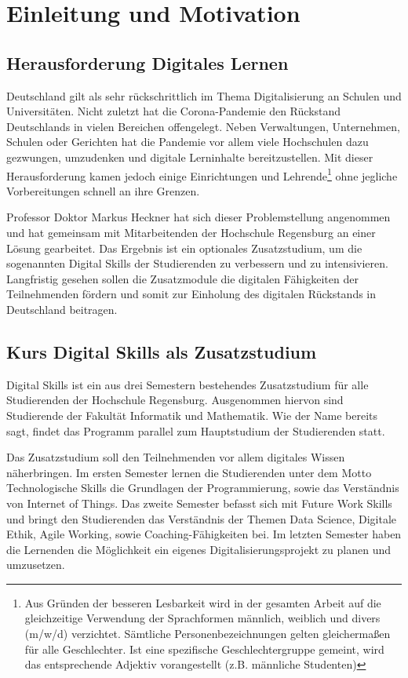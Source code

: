 \section{Einleitung und Motivation}\label{einleitung}
\subsection{Herausforderung Digitales Lernen}\label{herausforderung}
Deutschland gilt als sehr rückschrittlich im Thema Digitalisierung an Schulen
und Universitäten. Nicht zuletzt hat die Corona-Pandemie den Rückstand
Deutschlands in vielen Bereichen offengelegt. Neben Verwaltungen, Unternehmen,
Schulen oder Gerichten hat die Pandemie vor allem viele Hochschulen dazu
gezwungen, umzudenken und digitale Lerninhalte bereitzustellen. Mit dieser
Herausforderung kamen jedoch einige Einrichtungen und Lehrende\footnote{Aus
Gründen der besseren Lesbarkeit wird in der gesamten Arbeit auf die
gleichzeitige Verwendung der Sprachformen männlich, weiblich und divers (m/w/d)
verzichtet. Sämtliche Personenbezeichnungen gelten gleichermaßen für alle
Geschlechter. Ist eine spezifische Geschlechtergruppe gemeint, wird das
entsprechende Adjektiv vorangestellt (z.B. \glqq männliche Studenten\grqq)} ohne
jegliche Vorbereitungen schnell an ihre Grenzen. \parencite{bmwi-rueckstand}

Professor Doktor Markus Heckner hat sich dieser Problemstellung angenommen und
hat gemeinsam mit Mitarbeitenden der Hochschule Regensburg an einer Lösung
gearbeitet. Das Ergebnis ist ein optionales Zusatzstudium, um die sogenannten
\glqq Digital Skills\grqq{} der Studierenden zu verbessern und zu intensivieren.
Langfristig gesehen sollen die Zusatzmodule die digitalen Fähigkeiten der
Teilnehmenden fördern und somit zur Einholung des digitalen Rückstands in
Deutschland beitragen. \parencite{digital-skills}

\subsection{Kurs Digital Skills als Zusatzstudium}\label{kurs-digital-skills}
Digital Skills ist ein aus drei Semestern bestehendes Zusatzstudium für alle
Studierenden der Hochschule Regensburg. Ausgenommen hiervon sind Studierende der
Fakultät Informatik und Mathematik. Wie der Name bereits sagt, findet das
Programm parallel zum Hauptstudium der Studierenden statt.

Das Zusatzstudium soll den Teilnehmenden vor allem digitales Wissen
näherbringen. Im ersten Semester lernen die Studierenden unter dem Motto
\glqq Technologische Skills\grqq{} die Grundlagen der Programmierung, sowie das
Verständnis von Internet of Things. Das zweite Semester befasst sich mit
\glqq Future Work Skills\grqq{} und bringt den Studierenden das Verständnis der
Themen \glqq Data Science\grqq{}, \glqq Digitale Ethik\grqq{},
\glqq Agile Working\grqq{}, sowie \glqq Coaching-Fähigkeiten\grqq{} bei. Im
letzten Semester haben die Lernenden die Möglichkeit ein eigenes
Digitalisierungsprojekt zu planen und umzusetzen.

